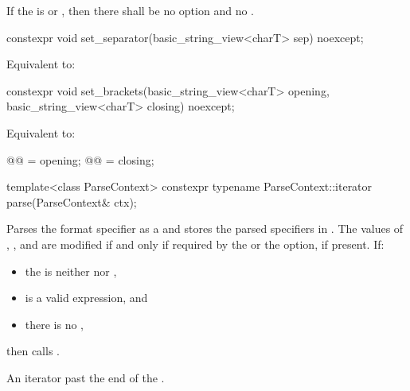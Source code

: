 If the  is  or ,
then there shall be
no  option and no .

%
\begin{itemdecl}
constexpr void set_separator(basic_string_view<charT> sep) noexcept;
\end{itemdecl}

\begin{itemdescr}
\pnum
\effects
Equivalent to: 
\end{itemdescr}

%
\begin{itemdecl}
constexpr void set_brackets(basic_string_view<charT> opening,
                            basic_string_view<charT> closing) noexcept;
\end{itemdecl}

\begin{itemdescr}
\pnum
\effects
Equivalent to:
\begin{codeblock}
@@ = opening;
@@ = closing;
\end{codeblock}
\end{itemdescr}

%
\begin{itemdecl}
template<class ParseContext>
  constexpr typename ParseContext::iterator
    parse(ParseContext& ctx);
\end{itemdecl}

\begin{itemdescr}
\pnum
\effects
Parses the format specifier as a  and
stores the parsed specifiers in .
The values of
, , and 
are modified if and only if required by
the  or the  option, if present.
If:
\begin{itemize}
\item
the  is neither  nor ,
\item
{} is a valid expression, and
\item
there is no ,
\end{itemize}
then calls .

\pnum
\returns
An iterator past the end of the .
\end{itemdescr}

